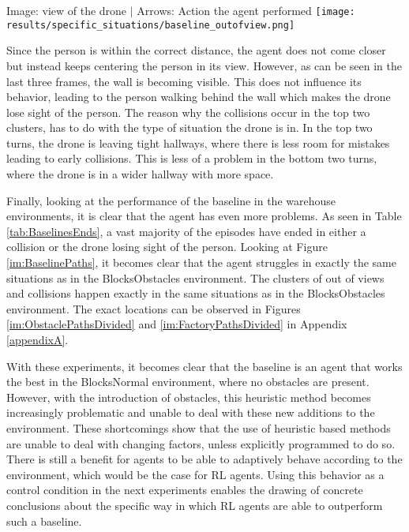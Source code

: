 \begin{Figure}
    \centering
    \small
    Image: view of the drone $|$ Arrows: Action the agent performed
    \texttt{[image: results/specific\_situations/baseline\_outofview.png]}
    \label{im:BaselineLostSight}
\end{Figure}

Since the person is within the correct distance, the agent does not come closer but 
instead keeps centering the person in its view. However, as can be seen in the last 
three frames, the wall is becoming visible. This does not influence its 
behavior, leading to the person walking behind the wall which makes the drone 
lose sight of the person. The reason why the collisions occur in the 
top two clusters, has to do with the type of situation the drone is in. In the top two 
turns, the drone is leaving tight hallways, where there is less room for mistakes leading 
to early collisions. This is less of a problem in the bottom two turns, where the drone is 
in a wider hallway with more space. 

Finally, looking at the performance of the baseline in the warehouse environments, 
it is clear that the agent has even more problems. As seen in Table \ref{tab:BaselinesEnds}, 
a vast majority of the episodes have ended in either a collision or the drone 
losing sight 
of the person. Looking at Figure \ref{im:BaselinePaths}, it becomes clear 
that the agent struggles in exactly the same situations as in the BlocksObstacles 
environment. The clusters of out of views and collisions happen exactly 
in the same situations as in the BlocksObstacles environment. The exact 
locations can be observed in Figures \ref{im:ObstaclePathsDivided} and \ref{im:FactoryPathsDivided} 
in Appendix \ref{appendixA}.

With these experiments, it becomes clear that the baseline is an agent that works
the best in the BlocksNormal environment, where no obstacles are present. However, 
with the introduction of obstacles, this heuristic method becomes increasingly 
problematic and unable to deal with these new additions to the environment. These shortcomings 
show that the use of heuristic based methods are unable to deal with changing factors, 
unless explicitly programmed to do so.  There is still a benefit for agents to be able 
to adaptively behave according to the environment, which would be the case for RL agents. 
Using this behavior as a control condition in the next experiments enables the drawing of 
concrete conclusions about the specific way in which RL agents are able to outperform 
such a baseline. 


